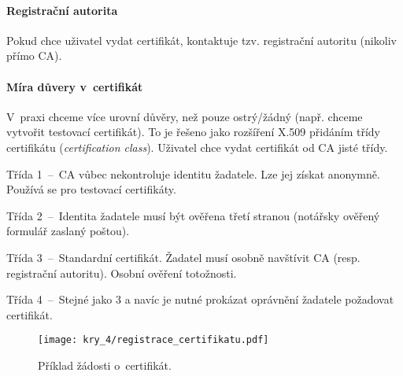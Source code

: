 \paragraph*{Registrační autorita} Pokud chce uživatel vydat certifikát, kontaktuje tzv. registrační autoritu (nikoliv přímo CA).

\paragraph*{Míra důvery v~certifikát}  V~praxi chceme více urovní důvěry, než pouze ostrý/žádný (např. chceme vytvořit testovací certifikát). To je řešeno jako rozšíření X.509 přidáním třídy certifikátu (\textit{certification class}). Uživatel chce vydat certifikát od CA jisté třídy. \begin{compactitem}
    \item Třída 1~--~CA vůbec nekontroluje identitu žadatele. Lze jej získat anonymně. Používá se pro testovací certifikáty.
    \item Třída 2~--~Identita žadatele musí být ověřena třetí stranou (notářsky ověřený formulář zaslaný poštou).
    \item Třída 3~--~Standardní certifikát. Žadatel musí osobně navštívit CA (resp. registrační autoritu). Osobní ověření totožnosti.
    \item Třída 4~--~Stejné jako 3 a navíc je nutné prokázat oprávnění žadatele požadovat certifikát.
\end{compactitem}

\begin{figure}[H]
    \centering
    \texttt{[image: kry\_4/registrace\_certifikatu.pdf]}
    \caption{Příklad žádosti o~certifikát.}
\end{figure}
